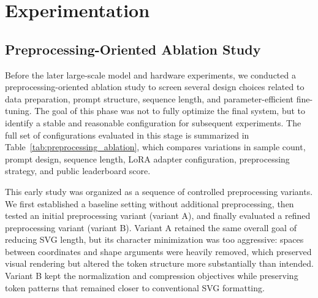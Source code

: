 \documentclass[11pt]{article}
\begin{document}
\section{Experimentation}

\subsection{Preprocessing-Oriented Ablation Study}

Before the later large-scale model and hardware experiments, we conducted a
preprocessing-oriented ablation study to screen several design choices related
to data preparation, prompt structure, sequence length, and parameter-efficient
fine-tuning. The goal of this phase was not to fully optimize the final
system, but to identify a stable and reasonable configuration for subsequent
experiments. The full set of configurations evaluated in this stage is
summarized in Table~\ref{tab:preprocessing_ablation}, which compares
variations in sample count, prompt design, sequence length, LoRA adapter
configuration, preprocessing strategy, and public leaderboard score.

This early study was organized as a sequence of controlled preprocessing
variants. We first established a baseline setting without additional
preprocessing, then tested an initial preprocessing variant (variant A), and
finally evaluated a refined preprocessing variant (variant B). Variant A
retained the same overall goal of reducing SVG length, but its character
minimization was too aggressive: spaces between coordinates and shape
arguments were heavily removed, which preserved visual rendering but altered
the token structure more substantially than intended. Variant B kept the
normalization and compression objectives while preserving token patterns that
remained closer to conventional SVG formatting.
\end{document}
